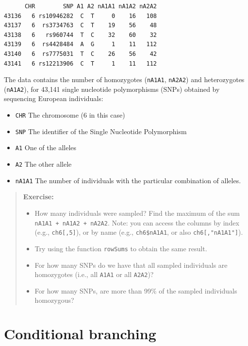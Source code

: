\documentclass[
  letterpaper,
  DIV=11,
  numbers=noendperiod]{scrreprt}
\providecommand{\tightlist}{%
  \setlength{\itemsep}{0pt}\setlength{\parskip}{0pt}}\usepackage{longtable,booktabs,array}
\begin{document}
\begin{verbatim}
      CHR        SNP A1 A2 nA1A1 nA1A2 nA2A2
43136   6 rs10946282  C  T     0    16   108
43137   6  rs3734763  C  T    19    56    48
43138   6   rs960744  T  C    32    60    32
43139   6  rs4428484  A  G     1    11   112
43140   6  rs7775031  T  C    26    56    42
43141   6 rs12213906  C  T     1    11   112
\end{verbatim}

The data contains the number of homozygotes (\texttt{nA1A1},
\texttt{nA2A2}) and heterozygotes (\texttt{nA1A2}), for 43,141 single
nucleotide polymorphisms (SNPs) obtained by sequencing European
individuals:

\begin{itemize}
\tightlist
\item
  \texttt{CHR} The chromosome (6 in this case)
\item
  \texttt{SNP} The identifier of the Single Nucleotide Polymorphism
\item
  \texttt{A1} One of the alleles
\item
  \texttt{A2} The other allele
\item
  \texttt{nA1A1} The number of individuals with the particular
  combination of alleles.
\end{itemize}

\begin{quote}
\textbf{Exercise:}

\begin{itemize}
\tightlist
\item
  How many individuals were sampled? Find the maximum of the sum
  \texttt{nA1A1\ +\ nA1A2\ +\ nA2A2}. Note: you can access the columns
  by index (e.g., \texttt{ch6{[},5{]}}), or by name (e.g.,
  \texttt{ch6\$nA1A1}, or also \texttt{ch6{[},"nA1A1"{]}}).
\item
  Try using the function \texttt{rowSums} to obtain the same result.
\item
  For how many SNPs do we have that all sampled individuals are
  homozygotes (i.e., all \texttt{A1A1} or all \texttt{A2A2})?
\item
  For how many SNPs, are more than 99\% of the sampled individuals
  homozygous?
\end{itemize}
\end{quote}

\hypertarget{conditional-branching}{%
\section{Conditional branching}\label{conditional-branching}}
\end{document}
